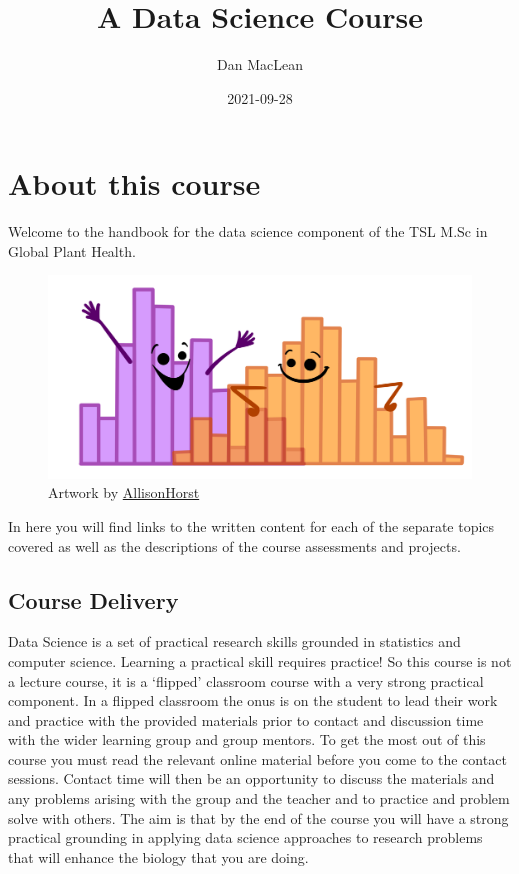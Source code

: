 \documentclass[
]{book}
\title{A Data Science Course}
\author{Dan MacLean}
\date{2021-09-28}
\begin{document}
\maketitle

{
\setcounter{tocdepth}{1}
\tableofcontents
}
\hypertarget{about-this-course}{%
\chapter{About this course}\label{about-this-course}}

Welcome to the handbook for the data science component of the TSL M.Sc in Global Plant Health.

\begin{figure}
\centering
\includegraphics{ex_1.png}
\caption{\label{fig:unnamed-chunk-1}Artwork by \href{https://github.com/allisonhorst}{AllisonHorst}}
\end{figure}

In here you will find links to the written content for each of the separate topics covered as well as the descriptions of the course assessments and projects.

\hypertarget{course-delivery}{%
\section{Course Delivery}\label{course-delivery}}

Data Science is a set of practical research skills grounded in statistics and computer science. Learning a practical skill requires practice! So this course is not a lecture course, it is a `flipped' classroom course with a very strong practical component. In a flipped classroom the onus is on the student to lead their work and practice with the provided materials prior to contact and discussion time with the wider learning group and group mentors. To get the most out of this course you must read the relevant online material before you come to the contact sessions. Contact time will then be an opportunity to discuss the materials and any problems arising with the group and the teacher and to practice and problem solve with others. The aim is that by the end of the course you will have a strong practical grounding in applying data science approaches to research problems that will enhance the biology that you are doing.
\end{document}
